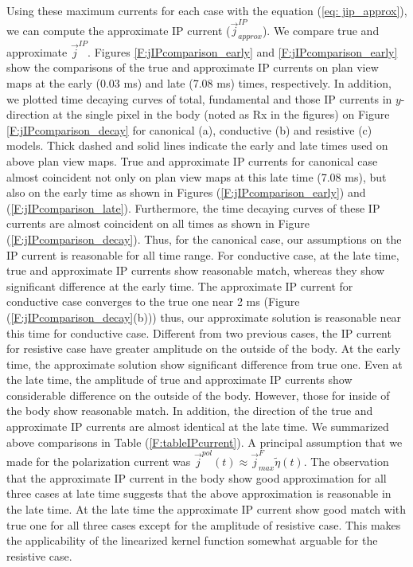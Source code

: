 \documentclass[a4paper, 11pt]{article}
\renewcommand {\j}  { {\vec j} }
\newcommand{\peta}{\tilde{\eta}}
\begin{document}
Using these maximum currents for each case with the equation (\ref{eq: jip_approx}), we can compute the approximate IP current ($\j^{IP}_{approx}$). We compare true and approximate $\j^{IP}$. Figures \ref{F:jIPcomparison_early} and \ref{F:jIPcomparison_early} show the comparisons of the true and approximate IP currents on plan view maps at the early (0.03 ms) and late (7.08 ms) times, respectively.  In addition, we plotted time decaying curves of total, fundamental and those IP currents in $y$-direction at the single pixel in the body (noted as Rx in the figures) on Figure \ref{F:jIPcomparison_decay} for canonical (a), conductive (b) and resistive (c) models. Thick dashed and solid lines indicate the early and late times used on above plan view maps.  True and approximate IP currents for canonical case almost coincident not only on plan view maps at this late time (7.08 ms), but also on the early time as shown in Figures (\ref{F:jIPcomparison_early}) and (\ref{F:jIPcomparison_late}). Furthermore, the time decaying curves of these IP currents are almost coincident on all times as shown in Figure (\ref{F:jIPcomparison_decay}). Thus, for the canonical case, our assumptions on the IP current is reasonable for all time range. For conductive case, at the late time,  true and approximate IP currents show reasonable match, whereas they show significant difference at the early time. The approximate IP current for conductive case converges to the true one near 2 ms (Figure (\ref{F:jIPcomparison_decay}(b))) thus, our approximate solution is reasonable near this time for conductive case. Different from two previous cases, the IP current for resistive case have greater amplitude on the outside of the body. At the early time, the approximate solution show significant difference from true one. Even at the late time, the amplitude of true and approximate IP currents show considerable difference on the outside of the body. However, those for inside of the body show reasonable match. In addition, the direction of the true and approximate IP currents are almost identical at the late time. We summarized above comparisons in Table (\ref{F:tableIPcurrent}). A principal assumption that we made for the polarization current was $\j^{pol}(t) \approx \j^{F}_{max}\peta(t)$. The observation that the approximate IP current in the body show good approximation for all three cases at late time suggests that the above approximation is reasonable in the late time. At the late time the approximate IP current show good match with true one for all three cases except for the amplitude of resistive case. This makes the applicability of the linearized kernel function somewhat arguable for the resistive case. 
\end{document}
